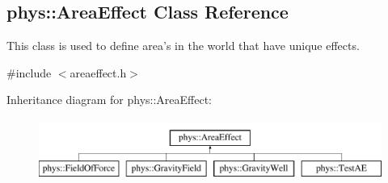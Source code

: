 \hypertarget{classphys_1_1AreaEffect}{
\subsection{phys::AreaEffect Class Reference}
\label{d4/d55/classphys_1_1AreaEffect}
}


This class is used to define area's in the world that have unique effects.  




{\ttfamily \#include $<$areaeffect.h$>$}

Inheritance diagram for phys::AreaEffect:\begin{figure}[H]
\begin{center}
\leavevmode
\includegraphics[height=2.000000cm]{d4/d55/classphys_1_1AreaEffect}
\end{center}
\end{figure}

